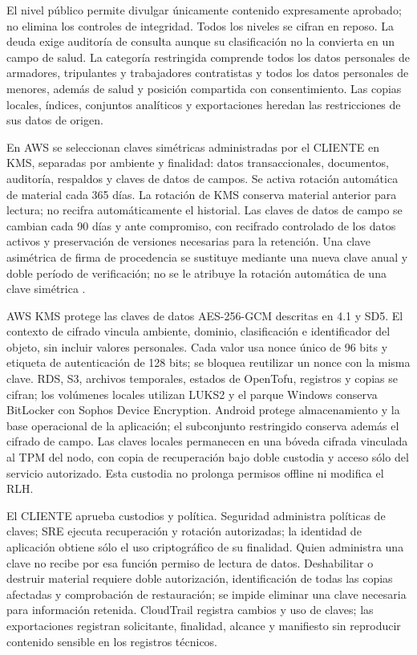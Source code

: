 El nivel público permite divulgar únicamente contenido expresamente aprobado; no elimina los controles de integridad. Todos los niveles se cifran en reposo. La deuda exige auditoría de consulta aunque su clasificación no la convierta en un campo de salud. La categoría restringida comprende todos los datos personales de armadores, tripulantes y trabajadores contratistas y todos los datos personales de menores, además de salud y posición compartida con consentimiento. Las copias locales, índices, conjuntos analíticos y exportaciones heredan las restricciones de sus datos de origen.

En AWS se seleccionan claves simétricas administradas por el CLIENTE en KMS, separadas por ambiente y finalidad: datos transaccionales, documentos, auditoría, respaldos y claves de datos de campos. Se activa rotación automática de material cada 365 días. La rotación de KMS conserva material anterior para lectura; no recifra automáticamente el historial. Las claves de datos de campo se cambian cada 90 días y ante compromiso, con recifrado controlado de los datos activos y preservación de versiones necesarias para la retención. Una clave asimétrica de firma de procedencia se sustituye mediante una nueva clave anual y doble período de verificación; no se le atribuye la rotación automática de una clave simétrica \parencite{sec-kms-rotacion}.

AWS KMS protege las claves de datos AES-256-GCM descritas en 4.1 y SD5. El contexto de cifrado vincula ambiente, dominio, clasificación e identificador del objeto, sin incluir valores personales. Cada valor usa nonce único de 96 bits y etiqueta de autenticación de 128 bits; se bloquea reutilizar un nonce con la misma clave. RDS, S3, archivos temporales, estados de OpenTofu, registros y copias se cifran; los volúmenes locales utilizan LUKS2 y el parque Windows conserva BitLocker con Sophos Device Encryption. Android protege almacenamiento y la base operacional de la aplicación; el subconjunto restringido conserva además el cifrado de campo. Las claves locales permanecen en una bóveda cifrada vinculada al TPM del nodo, con copia de recuperación bajo doble custodia y acceso sólo del servicio autorizado. Esta custodia no prolonga permisos offline ni modifica el RLH.

El CLIENTE aprueba custodios y política. Seguridad administra políticas de claves; SRE ejecuta recuperación y rotación autorizadas; la identidad de aplicación obtiene sólo el uso criptográfico de su finalidad. Quien administra una clave no recibe por esa función permiso de lectura de datos. Deshabilitar o destruir material requiere doble autorización, identificación de todas las copias afectadas y comprobación de restauración; se impide eliminar una clave necesaria para información retenida. CloudTrail registra cambios y uso de claves; las exportaciones registran solicitante, finalidad, alcance y manifiesto sin reproducir contenido sensible en los registros técnicos.

